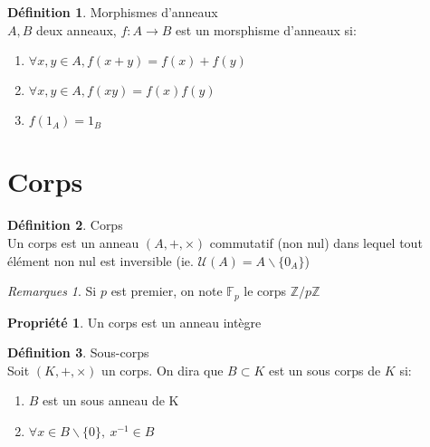 \documentclass[fleqn]{article}
\theoremstyle{definition} \newtheorem*{defi}{D\'efinition}
\theoremstyle{definition} \newtheorem*{theo}{Th\'eor\`eme}
\theoremstyle{definition} \newtheorem*{coro}{Corollaire}
\theoremstyle{definition} \newtheorem*{nota}{Notation}
\theoremstyle{remark} \newtheorem*{rqs}{Remarques}
\theoremstyle{definition} \newtheorem*{prop}{Propri\'et\'e}
\begin{document}
\begin{defi} Morphismes d'anneaux \\
	$A, B$ deux anneaux, $f:A \rightarrow B$ est un morsphisme d'anneaux si:
	\begin{enumerate}
		\item $\forall x,y \in A, f(x+y) = f(x) + f(y)$
		\item $\forall x,y \in A, f(xy) = f(x)f(y)$
		\item $f(1_A) = 1_B$
	\end{enumerate}
\end{defi}

\section{Corps}
\begin{defi} Corps \\
	Un corps est un anneau $(A,+,\times)$ commutatif (non nul) dans lequel tout \'el\'ement non nul est inversible
	(ie. $\mathcal{U}(A) = A\backslash\{0_A\}$)
	\begin{rqs}
		Si $p$ est premier, on note $\mathbb{F}_p$ le corps $\mathbb{Z}/p\mathbb{Z}$
	\end{rqs}
\end{defi}

\begin{prop}
	Un corps est un anneau int\`egre
\end{prop}

\begin{defi} Sous-corps \\
	Soit $(K,+,\times)$ un corps. On dira que $B \subset K$ est un sous corps de $K$ si:
	\begin{enumerate}
		\item $B$ est un sous anneau de K
		\item $\forall x \in B\backslash\{0\},\ x^{-1} \in B$
	\end{enumerate}
\end{defi}
\end{document}
